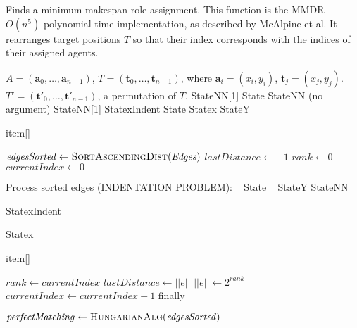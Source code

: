 \documentclass[notitlepage,english]{hgbreport}
\begin{document}
\begin{algorithm}	 %
\caption{Finds a minimum makespan role assignment. This function is the MMDR $O(n^5)$ polynomial time implementation, as described by McAlpine et al. It rearranges target positions $T$ so that their index corresponds with the indices of their assigned agents.}
\label{alg:mmdr}
\begin{algorithmic}[1]%
%
\Input $A = (\mathbf{a}_0, \dots, \mathbf{a}_{n-1})$, 
	$T = (\mathbf{t}_0, \dots, \mathbf{t}_{n-1})$,
	where $\mathbf{a}_i = (x_i, y_i)$, $\mathbf{t}_j = (x_j, y_j)$. 
\Output $T' = (\mathbf{t}'_0, \dots, \mathbf{t}'_{n-1})$, a permutation of $T$.
%
\StateNN[1] StateNN[1]
\State State
\StateNN StateNN (no argument)
\StateNN[1] StateNN[1]
\StatexIndent[1] StatexIndent
\State State
\Statex Statex
\StateY StateY
\item[] item[]


\State $\mathit{edgesSorted} \gets \Call{SortAscendingDist}{\mathit{Edges}}$
\State $\mathit{lastDistance} \gets -1$
\State $\mathit{rank} \gets 0$
\State$\mathit{currentIndex} \gets 0$


\Statex Process sorted edges (INDENTATION PROBLEM): \SHOWnested
{}
	 \SHOWthistlm\ \SHOWnested
		\State State \SHOWthistlm\ \SHOWnested
		\StateY StateY
		\StateNN StateNN
		
		\StatexIndent[3] StatexIndent
		
		\Statex Statex \SHOWnested
		\item[] item[] \SHOWnested
		
		\State$\mathit{rank} \gets \mathit{currentIndex}$ \SHOWnested
	\EndIf
	\State$\mathit{lastDistance} \gets ||e||$ \SHOWnested
	\State$||e|| \gets 2^{\mathit{rank}}$
	\State$\mathit{currentIndex} \gets \mathit{currentIndex} + 1$
	\State finally \SHOWnested
\EndFor

\State $\mathit{perfectMatching} \gets \Call{HungarianAlg}{\mathit{edgesSorted}}$ 
\EndProcedure
\end{algorithmic}
 \end{algorithm}
\end{document}

